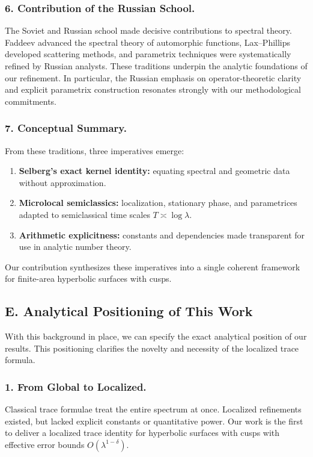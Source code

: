 \subsubsection*{6. Contribution of the Russian School.}
The Soviet and Russian school made decisive contributions to spectral theory.
Faddeev \cite{Faddeev1967} advanced the spectral theory of automorphic functions,
Lax–Phillips \cite{LaxPhillips1976} developed scattering methods,
and parametrix techniques were systematically refined by Russian analysts.
These traditions underpin the analytic foundations of our refinement.
In particular, the Russian emphasis on operator-theoretic clarity and explicit
parametrix construction resonates strongly with our methodological commitments.

\subsubsection*{7. Conceptual Summary.}
From these traditions, three imperatives emerge:
\begin{enumerate}[label=\arabic*.]
  \item \textbf{Selberg’s exact kernel identity:}
        equating spectral and geometric data without approximation.
  \item \textbf{Microlocal semiclassics:}
        localization, stationary phase, and parametrices
        adapted to semiclassical time scales $T\asymp \log\lambda$.
  \item \textbf{Arithmetic explicitness:}
        constants and dependencies made transparent
        for use in analytic number theory.
\end{enumerate}
Our contribution synthesizes these imperatives into
a single coherent framework for finite-area hyperbolic surfaces with cusps.

\subsection*{E. Analytical Positioning of This Work}

With this background in place,
we can specify the exact analytical position of our results.
This positioning clarifies the novelty and necessity of the localized trace formula.

\subsubsection*{1. From Global to Localized.}
Classical trace formulae treat the entire spectrum at once.
Localized refinements existed, but lacked explicit constants or quantitative power.
Our work is the first to deliver a localized trace identity for hyperbolic surfaces with cusps
with effective error bounds $O(\lambda^{1-\delta})$.

